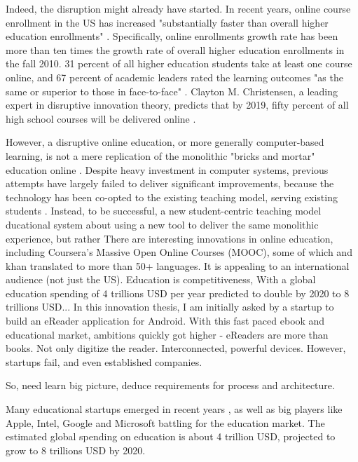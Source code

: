 \documentclass[a4paper,10pt]{book}
\begin{document}
Indeed, the disruption might already have started. In recent years, online course enrollment in the US has increased 
"substantially faster than overall higher education enrollments" \cite{babsonOnlineEduGrowth2011}. Specifically, online 
enrollments growth rate has been more than ten times the growth rate of overall higher education enrollments in the fall 2010. 
31 percent of all higher education 
students take at least  one course online, and 67 percent of academic leaders rated the learning outcomes 
"as the same or superior to those in face-to-face" \cite{babsonOnlineEduGrowth2011}. 
Clayton M. Christensen, a leading expert in disruptive innovation theory, predicts that by 2019,
fifty percent of all high school courses will be delivered online \cite{DisruptingClassExpandedEdition}.

However, a disruptive online education, or more generally computer-based learning, is not a mere replication of the monolithic 
"bricks and mortar" education online \cite{DisruptingClassExpandedEdition}. Despite heavy investment in computer systems, previous attempts have 
largely failed to deliver significant improvements, because the technology has been co-opted to the existing teaching model, serving 
existing students \cite{DisruptingClassExpandedEdition}. 
Instead, to be successful, a new student-centric teaching model ducational system 
about using a new tool to deliver the same monolithic experience, 
but rather
There are interesting innovations in online education, including Coursera's Massive Open Online Courses (MOOC), some of which 
and khan translated to more than 50+ languages. It is appealing to an international audience (not just the US).
Education is competitiveness, 
With a global education spending of 4 trillions USD per year predicted to double by 2020 to 8 trillions USD...
In this innovation thesis, I am initially asked by a startup to build an eReader application for Android. With this fast paced ebook and educational market,
ambitions quickly got higher - eReaders are more than books. Not only digitize the reader. Interconnected, powerful devices.
However, startups fail, and even established companies.

So, need learn big picture, deduce requirements for process and architecture.

Many educational startups emerged in recent years \cite{boomEducation1}\cite{boomEducation2}, as well as big players like Apple, Intel, 
Google and Microsoft battling for the education market. The estimated global spending on education is about 4 trillion USD, projected to grow to
8 trillions USD by 2020.
\end{document}

